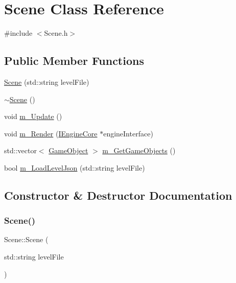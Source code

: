 \hypertarget{class_scene}{}\section{Scene Class Reference}
\label{class_scene}


{\ttfamily \#include $<$Scene.\+h$>$}

\subsection*{Public Member Functions}
\begin{DoxyCompactItemize}
\item 
\mbox{\hyperlink{class_scene_a2d8d697e4b432199f7c663e51ea1a62d}{Scene}} (std\+::string level\+File)
\item 
\mbox{\hyperlink{class_scene_a3b8cec2e32546713915f8c6303c951f1}{$\sim$\+Scene}} ()
\item 
void \mbox{\hyperlink{class_scene_a2d84a7dbabaf8b0dd135d754200cb126}{m\+\_\+\+Update}} ()
\item 
void \mbox{\hyperlink{class_scene_a09f503e90af9f19de0f461b827425ccb}{m\+\_\+\+Render}} (\mbox{\hyperlink{class_i_engine_core}{I\+Engine\+Core}} $\ast$engine\+Interface)
\item 
std\+::vector$<$ \mbox{\hyperlink{class_game_object}{Game\+Object}} $>$ \mbox{\hyperlink{class_scene_a183135dcbd5fa1c27da8246d9a185397}{m\+\_\+\+Get\+Game\+Objects}} ()
\item 
bool \mbox{\hyperlink{class_scene_ab44df8bc0f251a99a35b1c876cb02b46}{m\+\_\+\+Load\+Level\+Json}} (std\+::string level\+File)
\end{DoxyCompactItemize}


\subsection{Constructor \& Destructor Documentation}
\mbox{\label{class_scene_a2d8d697e4b432199f7c663e51ea1a62d}} 
\subsubsection{\texorpdfstring{Scene()}{Scene()}}
{\footnotesize\ttfamily Scene\+::\+Scene (\begin{DoxyParamCaption}\item[{std\+::string}]{level\+File }\end{DoxyParamCaption})}

